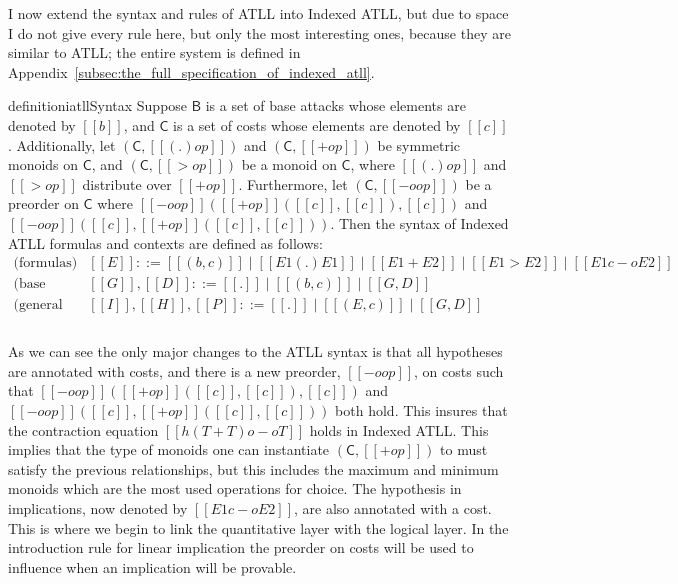 I now extend the syntax and rules of ATLL into Indexed ATLL, but due
to space I do not give every rule here, but only the most interesting
ones, because they are similar to ATLL; the entire system is defined
in Appendix~\ref{subsec:the_full_specification_of_indexed_atll}.
\begin{restatable}[]{definition}{iatllSyntax}
  \label{def:ATLL-syntax}
  Suppose $\mathsf{B}$ is a set of base attacks whose elements are
  denoted by $[[b]]$, and $\mathsf{C}$ is a set of costs whose
  elements are denoted by $[[c]]$.  Additionally, let
  $(\mathsf{C},[[(.)op]])$ and $(\mathsf{C},[[+op]])$ be symmetric
  monoids on $\mathsf{C}$, and $(\mathsf{C},[[>op]])$ be a monoid on
  $\mathsf{C}$, where $[[(.)op]]$ and $[[>op]]$ distribute over
  $[[+op]]$.  Furthermore, let $(\mathsf{C}, [[-oop]])$ be a preorder
  on $\mathsf{C}$ where $[[-oop]]([[+op]]([[c]],[[c]]),[[c]])$ and $[[-oop]]([[c]],[[+op]]([[c]],[[c]]))$.  Then
  the syntax of Indexed ATLL formulas and contexts are defined as
  follows:
  \[
  \begin{array}{cll}
    \text{(formulas)}         & [[E]] ::= [[(b, c)]] \mid [[E1 (.) E1]] \mid [[E1 + E2]] \mid [[E1 > E2]] \mid [[E1 c -o E2]]\\
    \text{(base contexts)}    & [[G]],[[D]] ::= [[.]] \mid [[(b,c)]] \mid [[G,D]]\\
    \text{(general contexts)} & [[I]],[[H]],[[P]] ::= [[.]] \mid [[(E,c)]] \mid [[G,D]]\\\\
  \end{array}
  \]
\end{restatable}
\vspace{-10px} As we can see the only major changes to the ATLL syntax
is that all hypotheses are annotated with costs, and there is a new
preorder, $[[-oop]]$, on costs such that
$[[-oop]]([[+op]]([[c]],[[c]]),[[c]])$ and
$[[-oop]]([[c]],[[+op]]([[c]],[[c]]))$ both hold.  This insures that
the contraction equation $[[h(T + T) o-o T]]$ holds in Indexed ATLL.
This implies that the type of monoids one can instantiate
$(\mathsf{C},[[+op]])$ to must satisfy the previous relationships, but
this includes the maximum and minimum monoids which are the most used
operations for choice. The hypothesis in implications, now denoted by
$[[E1 c -o E2]]$, are also annotated with a cost.  This is where we
begin to link the quantitative layer with the logical layer.  In the
introduction rule for linear implication the preorder on costs will be
used to influence when an implication will be provable.

